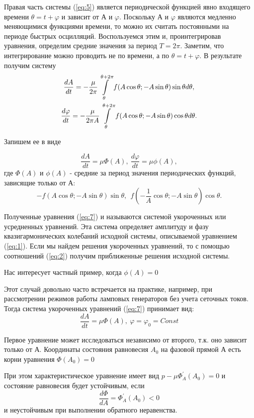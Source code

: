 Правая часть системы  (\ref{eq:5}) является периодической функцией явно входящего времени $\theta=t+\varphi$ и зависит от А и $\varphi$. Поскольку  А и $\varphi$ являются медленно меняющимися функциями времени, то можно их считать постоянными на периоде быстрых осцилляций. Воспользуемся этим и, проинтегрировав уравнения, определим средние значения за период $T=2\pi$. Заметим, что интегрирование можно проводить не по времени, а по $\theta=t+\varphi$. В результате получим систему
\begin{gather}
\label{eq:6}
\frac{dA}{dt}=-\frac{\mu}{2\pi}\int\limits_\theta^{\theta+2\pi} f(A\cos\theta;-A\sin\theta)\sin\theta d\theta,\\\notag
\frac{d\varphi}{dt}=-\frac{\mu}{2\pi A}\int\limits_\theta^{\theta+2\pi} f(A\cos\theta;-A\sin\theta)\cos\theta d\theta.
\end{gather}

Запишем ее в виде
   
\begin{equation}
\label{eq:7}
\frac{dA}{dt}=\mu \Phi(A),~\frac{d\varphi}{dt}=\mu \phi(A),
\end{equation}
где $\Phi(A)$ и $\phi(A)$ - средние за период значения периодических функций, зависящие только от А: $$-f(A\cos\theta;-A\sin\theta)\sin\theta,~~f(-\frac{1}{A} \cos\theta;-A\sin\theta)\cos\theta.$$

Полученные уравнения  (\ref{eq:7}) и называются системой укороченных или усредненных уравнений. Эта система определяет амплитуду и фазу квазигармонических колебаний исходной системы, описываемой уравнением  (\ref{eq:1}). Если мы найдем решения укороченных уравнений, то с помощью соотношений  (\ref{eq:2}) получим приближенные решения исходной системы.

Нас интересует частный пример, когда $\phi(A)=0$

Этот случай довольно часто встречается на практике, например, при рассмотрении режимов работы ламповых генераторов без учета сеточных токов. Тогда система укороченных уравнений  (\ref{eq:7}) принимает вид:
\begin{equation}
\label{eq:8}
\frac{dA}{dt}=\mu \Phi(A),~ \varphi=\varphi_0 = Const
\end{equation}

Первое уравнение может исследоваться независимо от второго, т.к. оно зависит только от А. Координаты состояния равновесия $A_{0}$ на фазовой прямой А есть корни уравнения $\Phi(A_{0})=0$

При этом характеристическое уравнение имеет вид $p-\mu \Phi^{'}_{A}(A_{0}) = 0$ и состояние равновесия будет устойчивым, если $$\frac{d\Phi}{dA}= \Phi^{'}_{A}(A_{0}) <0$$
и неустойчивым при выполнении обратного неравенства.

